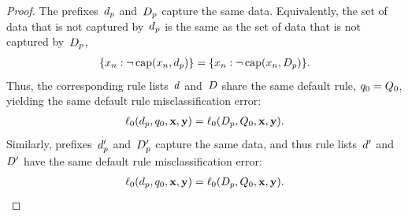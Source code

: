 \begin{proof}
The prefixes~$d_p$ and~$D_p$ capture the same data.
%
Equivalently, the set of data that is not captured by~$d_p$
is the same as the set of data that is not captured by~$D_p$, \ie
\begin{align}
\{x_n : \neg\, \Cap(x_n, \Prefix)\} = \{x_n : \neg\, \Cap(x_n, \PrefixB)\}.
\end{align}
Thus, the corresponding rule lists~${d}$ and~${D}$
share the same default rule, \ie ${q_0 = Q_0}$,
yielding the same default rule misclassification error:
\begin{align}
\Loss_0(\Prefix, \Default, \x, \y) = \Loss_0(\PrefixB, \DefaultB, \x, \y).
\end{align}
Similarly, prefixes~$d_p'$ and~$D_p'$ capture
the same data, and thus rule lists~${d}'$ and~${D}'$
have the same default rule misclassification error:
\begin{align}
\Loss_0(\Prefix, \Default, \x, \y) = \Loss_0(\PrefixB, \DefaultB, \x, \y).
\end{align}


\end{proof}
